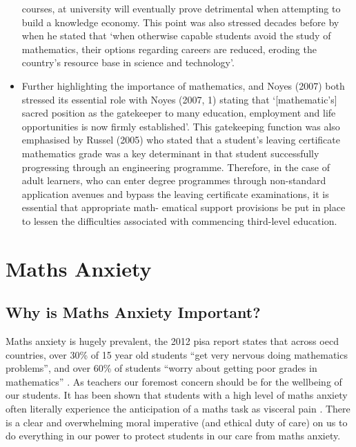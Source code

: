 \documentclass[twoside,12pt,a4paper]{report}
\begin{document}
\begin{itemize}
courses, at university will eventually prove detrimental when attempting to build a
knowledge economy. This point was also stressed decades before by \cite[pg34]{Hembree1990}
when he stated that ‘when otherwise capable students avoid the study of
mathematics, their options regarding careers are reduced, eroding the country’s
resource base in science and technology’.
	\item Further highlighting the importance of mathematics, \cite{Volmink1994} and
Noyes (2007) both stressed its essential role with Noyes (2007, 1) stating that
‘[mathematic’s] sacred position as the gatekeeper to many education, employment
and life opportunities is now firmly established’. This gatekeeping function was
also emphasised by Russel (2005) who stated that a student’s leaving certificate
mathematics grade was a key determinant in that student successfully progressing
through an engineering programme. Therefore, in the case of adult learners, who
can enter degree programmes through non-standard application avenues and
bypass the leaving certificate examinations, it is essential that appropriate math-
ematical support provisions be put in place to lessen the difficulties associated
with commencing third-level education.
\end{itemize}





\section{Maths Anxiety}


\subsection*{Why is Maths Anxiety Important?}

Maths anxiety is hugely prevalent, the 2012 \gls{pisa} report states that across \gls{oecd} countries, over 30\% of 15 year old students ``get very nervous doing mathematics problems'', and over 60\% of students ``worry about getting poor grades in mathematics''  \cite{PISA2013}. As teachers our foremost concern should be for the wellbeing of our students. It has been shown that students with a high level of maths anxiety often literally experience the anticipation of a maths task as visceral pain \cite{Lyons2012pain}. There is a clear and overwhelming moral imperative (and ethical duty of care) on us to do everything in our power to protect students in our care from maths anxiety.
\end{document}
